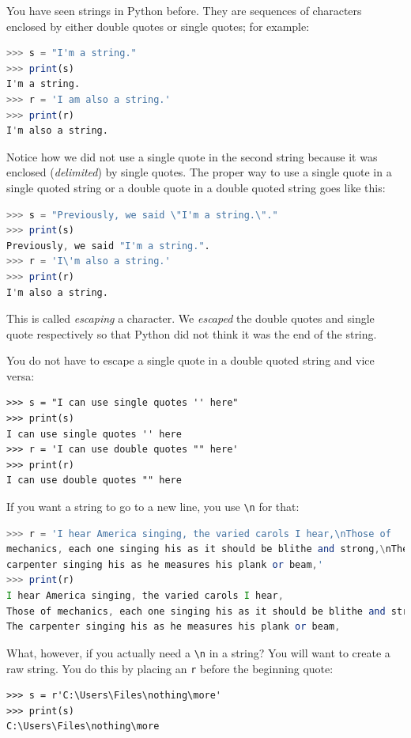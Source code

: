 \documentclass[11pt]{cselabheader}
\begin{document}
You have seen strings in Python before. They are sequences of characters
enclosed by either double quotes or single quotes; for example:
\begin{lstlisting}[style=ipython,language=Octave] % string escaping issues with Python style
>>> s = "I'm a string."
>>> print(s)
I'm a string.
>>> r = 'I am also a string.'
>>> print(r)
I'm also a string.
\end{lstlisting}

Notice how we did not use a single quote in the second string because it was
enclosed (\emph{delimited}) by single quotes. The proper way to use a single
quote in a single quoted string or a double quote in a double quoted string
goes like this:
\begin{lstlisting}[style=ipython,language=Octave]
>>> s = "Previously, we said \"I'm a string.\"."
>>> print(s)
Previously, we said "I'm a string.".
>>> r = 'I\'m also a string.'
>>> print(r)
I'm also a string.
\end{lstlisting}
This is called \emph{escaping} a character. We \emph{escaped} the double quotes
and single quote respectively so that Python did not think it was the end of
the string.

You do not have to escape a single quote in a double quoted string and vice
versa:
\begin{lstlisting}[style=ipython]
>>> s = "I can use single quotes '' here"
>>> print(s)
I can use single quotes '' here
>>> r = 'I can use double quotes "" here'
>>> print(r)
I can use double quotes "" here
\end{lstlisting}

If you want a string to go to a new line, you use \lstinline!\n! for that:
\begin{lstlisting}[style=ipython,language=Octave,caption={Excerpt of I Hear
America Singing by Walt Whitman}]
>>> r = 'I hear America singing, the varied carols I hear,\nThose of 
mechanics, each one singing his as it should be blithe and strong,\nThe 
carpenter singing his as he measures his plank or beam,'
>>> print(r)
I hear America singing, the varied carols I hear,
Those of mechanics, each one singing his as it should be blithe and strong,
The carpenter singing his as he measures his plank or beam,
\end{lstlisting}

What, however, if you actually need a \lstinline!\n! in a string? You will want
to create a raw string. You do this by placing an \lstinline!r! before the
beginning quote:
\begin{lstlisting}[style=ipython]
>>> s = r'C:\Users\Files\nothing\more'
>>> print(s)
C:\Users\Files\nothing\more
\end{lstlisting}
\end{document}
